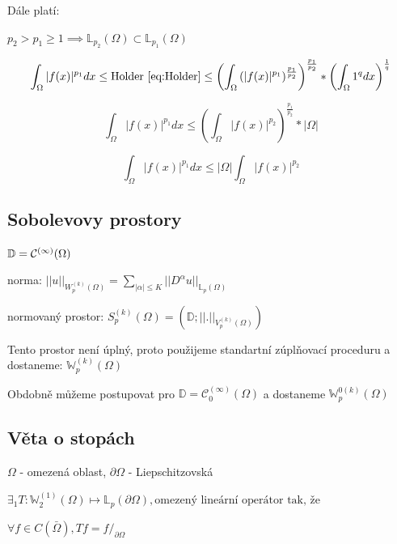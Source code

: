 \documentclass[../main.tex]{subfiles}
\begin{document}
Dále platí:

$p_2 > p_1 \geq 1 \implies \mathbb{L}_{p_2}(\Omega) \subset \mathbb{L}_{p_1}(\Omega)$

\begin{equation*}
    \int_\Omega |f(x)|^{p_1}dx \leq \text{Holder \eqref{eq:Holder}} \leq \left ( \int_\Omega \left ( |f(x)|^{p_1}\right )^{\frac{p_1}{p_2}} \right )^\frac{p_1}{p_2} * \left ( \int_\Omega 1 ^q dx \right ) ^ \frac{1}{q}
\end{equation*}

\begin{equation*}
    \int_\Omega |f(x)|^{p_1}dx \leq \left( \int_\Omega |f(x)|^{p_2} \right)^{\frac{p_1}{p_2}} * |\Omega|
\end{equation*}

\begin{equation*}
    \int_\Omega |f(x)|^{p_1}dx \leq |\Omega| \int_\Omega |f(x)|^{p_2}
\end{equation*}




\subsection{Sobolevovy prostory }

$\mathbb{D} = \mathcal{C}^{(\infty)}(\Omega)$

norma:
$||u||_{W_p^{(k)}(\Omega)} = \sum_{|\alpha| \leq K} ||D^\alpha u||_{\mathbb{L}_p(\Omega)}$

normovaný prostor: $S^{(k)}_p(\Omega) = (\mathbb{D}; ||.||_{V_p^{(k)}(\Omega)})$

Tento prostor není úplný, proto použijeme standartní zúplňovací proceduru a dostaneme:
$\mathbb{W}_p^{(k)}(\Omega)$

Obdobně můžeme postupovat pro $\mathbb{D} = \mathcal{C}^{(\infty)}_0(\Omega)$ a dostaneme $\mathbb{W}_p^{0 (k)}(\Omega)$

\subsection{Věta o stopách}

$\Omega$ - omezená oblast, $\partial \Omega$ - Liepschitzovská

$\exists_1 T: \mathbb{W}_2^{(1)}(\Omega) \mapsto \mathbb{L}_p (\partial \Omega), \text{omezený lineární operátor tak, že}$

$ \forall f\in C (\bar \Omega), Tf = f /_{\partial \Omega} $
\end{document}
